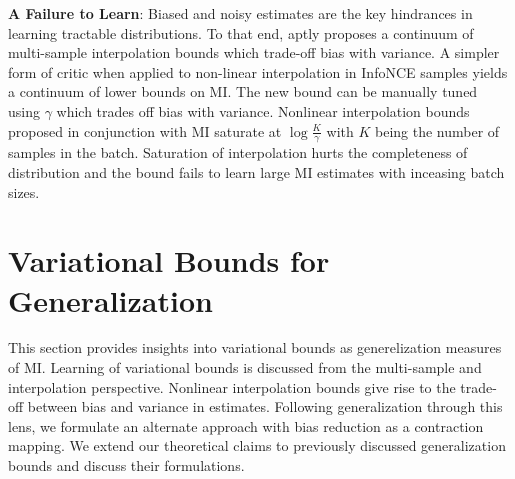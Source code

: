 \documentclass{article}
\begin{document}
\textbf{A Failure to Learn}: Biased and noisy estimates are the key hindrances in learning tractable distributions. To that end, \cite{variational} aptly proposes a continuum of multi-sample interpolation bounds which trade-off bias with variance. A simpler form of critic when applied to non-linear interpolation in InfoNCE samples yields a continuum of lower bounds on MI. The new bound can be manually tuned using $\gamma$ which trades off bias with variance. Nonlinear interpolation bounds proposed in conjunction with MI saturate at $\log \frac{K}{\gamma}$ with $K$ being the number of samples in the batch. Saturation of interpolation hurts the completeness of distribution and the bound fails to learn large MI estimates with inceasing batch sizes.  


\section{Variational Bounds for Generalization}
This section provides insights into variational bounds as generelization measures of MI. Learning of variational bounds is discussed from the multi-sample and interpolation perspective. Nonlinear interpolation bounds give rise to the trade-off between bias and variance in estimates. Following generalization through this lens, we formulate an alternate approach with bias reduction as a contraction mapping. We extend our theoretical claims to previously discussed generalization bounds and discuss their formulations.
\end{document}
